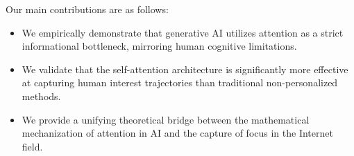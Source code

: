 Our main contributions are as follows:
\begin{itemize}[leftmargin=*,itemsep=0pt,topsep=0pt]
    \item We empirically demonstrate that generative AI utilizes attention as a strict informational bottleneck, mirroring human cognitive limitations.
    \item We validate that the self-attention architecture is significantly more effective at capturing human interest trajectories than traditional non-personalized methods.
    \item We provide a unifying theoretical bridge between the mathematical mechanization of attention in AI and the capture of focus in the Internet field.
\end{itemize}

